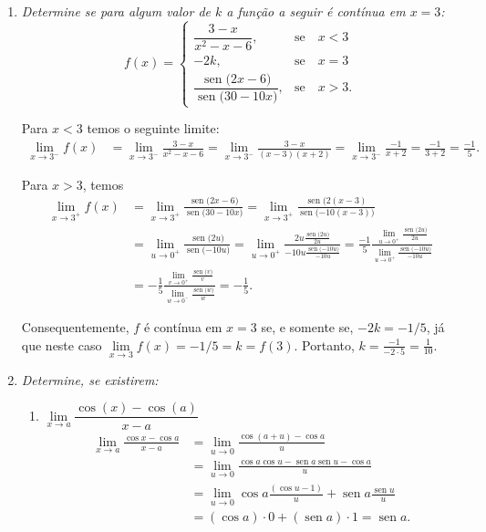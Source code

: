 \documentclass[12pt,a4paper]{article}
\newcommand*\sen[1]{\operatorname{sen}{#1}}
\begin{document}
\begin{enumerate}
\item \textit{ Determine se para algum valor de $k$ a função a seguir é contínua em $x = 3$:}
\[f(x)=\left\{\begin{array}{ll}
\dfrac{3-x}{x^2-x-6}, & \text{se}\quad x<3\\
-2 k, & \text{se}\quad x = 3 \\
\dfrac{\sen(2x - 6)}{\sen(30 - 10x)}, & \text{se}\quad x > 3.
\end{array}\right.
\]


Para $x<3$ temos o seguinte limite:
\begin{align*}
\lim\limits_{x\to 3^-} f(x)
& = \lim\limits_{x\to 3^-} \frac{3-x}{x^2-x-6}
  = \lim\limits_{x\to 3^-} \frac{3-x}{(x-3)(x+2)}
  = \lim\limits_{x\to 3^-} \frac{-1}{x+2}
  = \frac{-1}{3 +2}
  = \frac{-1}{5}.
\end{align*}

Para $x>3$, temos
\begin{align*}
\lim\limits_{x\to 3^+} f(x)
& = \lim\limits_{x\to 3^+} \frac{\sen(2x - 6)}{\sen(30 - 10x)}
  = \lim\limits_{x\to 3^+} \frac{\sen(2(x - 3)}{\sen(-10(x - 3))} \\
& = \lim\limits_{u\to 0^+} \frac{\sen(2u)}{\sen(-10u)}
  = \lim\limits_{u\to 0^+} \frac{ 2u \frac{ \sen(2u) }{2u} }{ -10u \frac{ \sen(-10u) }{-10u} }
  = \frac{-1}{5} \frac{ \lim\limits_{u\to 0^+} \frac{ \sen(2u) }{2u} }{ \lim\limits_{u\to 0^+} \frac{ \sen(-10u) }{-10u} } \\
& = -\frac{1}{5} \frac{ \lim\limits_{v\to 0^+} \frac{ \sen(v) }{v} }{\lim\limits_{w\to 0^-}  \frac{ \sen(w) }{w} }
  = -\frac{1}{5}.
\end{align*}

Consequentemente, $f$ é contínua em $x=3$ se, e somente se, $-2k = -1/5$, já que neste caso $\lim\limits_{x\to 3} f(x) = -1/5 = k = f(3)$. Portanto, $k = \frac{-1}{-2 \cdot 5} = \frac{1}{10}$.


\item \textit{ Determine, se existirem: }
\begin{enumerate}
\item $\lim\limits_{x\to a} \dfrac{\cos(x)-\cos(a)}{x-a}$
\begin{align*}
\lim\limits_{x\to a} \frac{\cos x-\cos a}{x-a}
& = \lim\limits_{u \to 0} \frac{\cos(a+u)-\cos a}{u}\\
& = \lim\limits_{u \to 0} \frac{\cos a \cos u -\sen a\sen u-\cos a}{u}\\
& = \lim\limits_{u \to 0} \cos a\frac{(\cos u - 1)}{u} + \sen a\frac{\sen u}{u}\\
& = (\cos a) \cdot 0 + (\sen a) \cdot 1
  = \sen a.\\
\end{align*}


\end{enumerate}
\end{enumerate}
\end{document}
